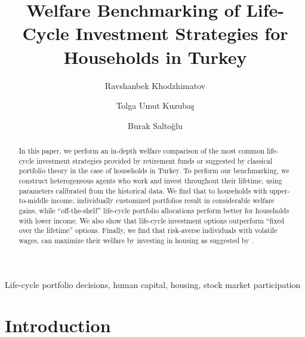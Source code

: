 \documentclass[]{elsarticle}
\begin{document}

\begin{frontmatter}


\title{Welfare Benchmarking of Life-Cycle Investment Strategies for Households in Turkey}


\author{Ravshanbek Khodzhimatov}
\author{Tolga Umut Kuzubaş}
\author{Burak Saltoğlu}

\address{Boğaziçi University, Department of Economics, Natuk Birkan Building, 34342 Bebek, Istanbul, Turkey}


\begin{abstract}
In this paper, we perform an in-depth welfare comparison of the most common life-cycle investment strategies provided by retirement funds or suggested by classical portfolio theory in the case of households in Turkey. To perform our benchmarking, we construct heterogeneous agents who work and invest throughout their lifetime, using parameters calibrated from the historical data. We find that to households with upper-to-middle income, individually customized portfolios result in considerable welfare gains, while ``off-the-shelf'' life-cycle portfolio allocations perform better for households with lower income. We also show that life-cycle investment options outperform ``fixed over the lifetime'' options. Finally, we find that risk-averse individuals with volatile wages, can maximize their welfare by investing in housing as suggested by \citet{munk}.
\end{abstract}


\begin{keyword}
	Life-cycle portfolio decisions, human capital, housing, stock market participation
\end{keyword}


\end{frontmatter}


\section{Introduction} %
\label{intro} %
\end{document}
